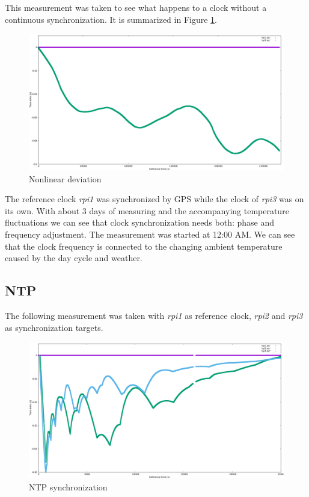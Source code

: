 This measurement was taken to see what happens to a clock without a continuous synchronization. It is summarized in Figure \ref{fig:plot_nonlinear}.

\begin{figure}[tb]
	\centering
	\includegraphics[width=1.0\textwidth]{figures/plot_nonlinear.png}
	\caption{Nonlinear deviation}
	\label{fig:plot_nonlinear}
\end{figure}

The reference clock \textit{rpi1} was synchronized by GPS while the clock of \textit{rpi3} was on its own. With about 3 days of measuring and the accompanying temperature fluctuations we can see that clock synchronization needs both: phase and frequency adjustment.
The measurement was started at 12:00 AM. We can see that the clock frequency is connected to the changing ambient temperature caused by the day cycle and weather.

\subsection{NTP}

The following measurement was taken with \textit{rpi1} as reference clock, \textit{rpi2} and \textit{rpi3} as synchronization targets.

\begin{figure}[tb]
	\centering
	\includegraphics[width=1.0\textwidth]{figures/plot_ntp1.png}
	\caption{NTP synchronization}
	\label{fig:plot_ntp1}
\end{figure}

